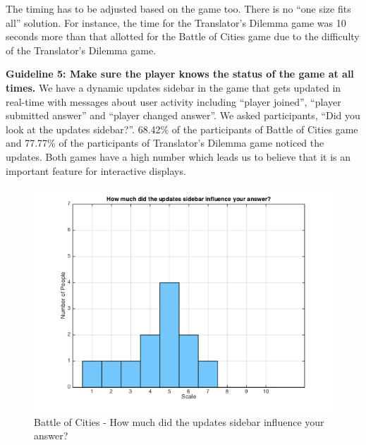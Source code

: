 \documentclass{sig-alternate}
\begin{document}
The timing has to be adjusted based on the game too. There is no ``one size fits all'' solution. For instance, the time for the Translator's Dilemma game was 10 seconds more than that allotted for the Battle of Cities game due to the difficulty of the Translator's Dilemma game.

\textbf{Guideline 5: Make sure the player knows the status of the game at all times.}
We have a dynamic updates sidebar in the game that gets updated in real-time with messages about user activity including ``player joined'', ``player submitted answer'' and ``player changed answer''. We asked participants, ``Did you look at the updates sidebar?''. 68.42\% of the participants of Battle of Cities game and 77.77\% of the participants of Translator's Dilemma game noticed the updates. Both games have a high number which leads us to believe that it is an important feature for interactive displays.

\begin{figure}
	\includegraphics[width=\linewidth]{p_influence.png}
	\caption{Battle of Cities - How much did the updates sidebar influence your answer?}
	\label{fig:p_influence}
\end{figure}
\end{document}
